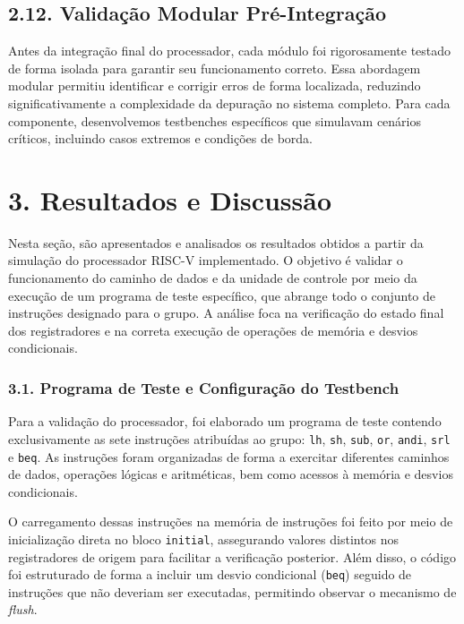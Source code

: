 \documentclass[12pt, a4paper]{article}
\begin{document}
\subsection*{2.12. Validação Modular Pré-Integração}

Antes da integração final do processador, cada módulo foi rigorosamente testado de forma isolada para garantir seu funcionamento correto. Essa abordagem modular permitiu identificar e corrigir erros de forma localizada, reduzindo significativamente a complexidade da depuração no sistema completo. Para cada componente, desenvolvemos testbenches específicos que simulavam cenários críticos, incluindo casos extremos e condições de borda.

\section*{3. Resultados e Discussão}

Nesta seção, são apresentados e analisados os resultados obtidos a partir da simulação do processador RISC-V implementado. O objetivo é validar o funcionamento do caminho de dados e da unidade de controle por meio da execução de um programa de teste específico, que abrange todo o conjunto de instruções designado para o grupo. A análise foca na verificação do estado final dos registradores e na correta execução de operações de memória e desvios condicionais.

\subsubsection*{3.1. Programa de Teste e Configuração do Testbench}

Para a validação do processador, foi elaborado um programa de teste contendo exclusivamente as sete instruções atribuídas ao grupo: \texttt{lh}, \texttt{sh}, \texttt{sub}, \texttt{or}, \texttt{andi}, \texttt{srl} e \texttt{beq}. As instruções foram organizadas de forma a exercitar diferentes caminhos de dados, operações lógicas e aritméticas, bem como acessos à memória e desvios condicionais.

O carregamento dessas instruções na memória de instruções foi feito por meio de inicialização direta no bloco \texttt{initial}, assegurando valores distintos nos registradores de origem para facilitar a verificação posterior. Além disso, o código foi estruturado de forma a incluir um desvio condicional (\texttt{beq}) seguido de instruções que não deveriam ser executadas, permitindo observar o mecanismo de \textit{flush}.
\end{document}

